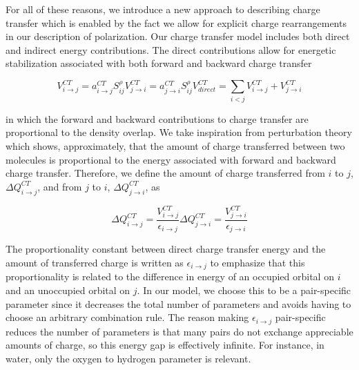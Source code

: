 \documentclass[journal=jctcce,manuscript=article]{achemso}
\begin{document}
For all of these reasons, we introduce a new approach to describing charge transfer
which is enabled by the fact we allow for explicit charge rearrangements in our
description of polarization. Our charge transfer model includes both direct and
indirect energy contributions. The direct contributions allow for energetic stabilization
associated with both forward and backward charge transfer

\begin{subequations}
  \begin{equation}
  V^{CT}_{i\rightarrow j}=a_{i\rightarrow j}^{CT}S_{ij}^\rho
\end{equation}
\begin{equation}
  V^{CT}_{j\rightarrow i}=a_{j\rightarrow i}^{CT}S_{ij}^\rho
\end{equation}
\begin{equation}
  V^{CT}_{direct}=\sum_{i<j}V^{CT}_{i\rightarrow j}+V^{CT}_{j\rightarrow i}
\end{equation}
  \label{eq:ct_direct}
\end{subequations}

in which the forward and backward contributions to
charge transfer are proportional to the density overlap. We take inspiration from perturbation theory which shows, approximately, that
the amount of charge transferred between two molecules is proportional to the
energy associated with forward and backward charge transfer.\cite{khaliullin2007unravelling,khaliullin2008analysis,khaliullin2009electron}
Therefore, we define the amount of charge transferred from $i$ to $j$, $\Delta Q^{CT}_{i\rightarrow j}$,
and from $j$ to $i$, $\Delta Q^{CT}_{j\rightarrow i}$, as

\begin{subequations}
  \begin{equation}
  \Delta Q^{CT}_{i\rightarrow j}=\frac{V^{CT}_{i\rightarrow j}}{\epsilon_{i\rightarrow j}}
\end{equation}
\begin{equation}
  \Delta Q^{CT}_{j\rightarrow i}=\frac{V^{CT}_{j\rightarrow i}}{\epsilon_{j\rightarrow i}}
\end{equation}
\end{subequations}

The proportionality constant between direct charge transfer energy and the amount of transferred charge is written as $\epsilon_{i\rightarrow j}$ to emphasize that this proportionality is related to the difference in energy of an occupied orbital on $i$ and an unoccupied orbital on $j$.\cite{khaliullin2007unravelling} In our model, we choose this to be a pair-specific parameter since it decreases the total number of parameters and avoids having to choose an arbitrary combination rule. The reason making $\epsilon_{i\rightarrow j}$ pair-specific reduces the number of parameters is that many pairs do not exchange appreciable amounts of charge, so this energy gap is effectively infinite. For instance, in water, only the oxygen to hydrogen parameter is relevant.
\end{document}
